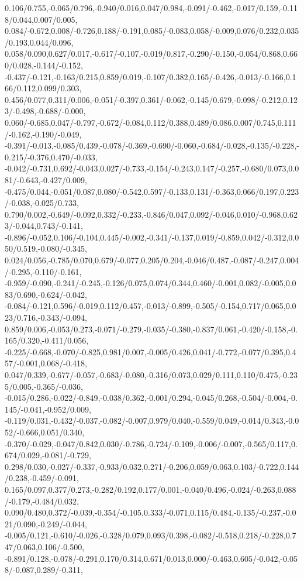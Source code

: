 {0.106/0.755,-0.065/0.796,-0.940/0.016,0.047/0.984,-0.091/-0.462,-0.017/0.159,-0.118/0.044,0.007/0.005,%
0.084/-0.672,0.008/-0.726,0.188/-0.191,0.085/-0.083,0.058/-0.009,0.076/0.232,0.035/0.193,0.044/0.096,%
0.058/0.090,0.627/0.017,-0.617/-0.107,-0.019/0.817,-0.290/-0.150,-0.054/0.868,0.660/0.028,-0.144/-0.152,%
-0.437/-0.121,-0.163/0.215,0.859/0.019,-0.107/0.382,0.165/-0.426,-0.013/-0.166,0.166/0.112,0.099/0.303,%
0.456/0.077,0.311/0.006,-0.051/-0.397,0.361/-0.062,-0.145/0.679,-0.098/-0.212,0.123/-0.498,-0.688/-0.000,%
0.060/-0.685,0.047/-0.797,-0.672/-0.084,0.112/0.388,0.489/0.086,0.007/0.745,0.111/-0.162,-0.190/-0.049,%
-0.391/-0.013,-0.085/0.439,-0.078/-0.369,-0.690/-0.060,-0.684/-0.028,-0.135/-0.228,-0.215/-0.376,0.470/-0.033,%
-0.042/-0.731,0.692/-0.043,0.027/-0.733,-0.154/-0.243,0.147/-0.257,-0.680/0.073,0.081/-0.643,-0.427/0.009,%
-0.475/0.044,-0.051/0.087,0.080/-0.542,0.597/-0.133,0.131/-0.363,0.066/0.197,0.223/-0.038,-0.025/0.733,%
0.790/0.002,-0.649/-0.092,0.332/-0.233,-0.846/0.047,0.092/-0.046,0.010/-0.968,0.623/-0.044,0.743/-0.141,%
-0.896/-0.052,0.106/-0.104,0.445/-0.002,-0.341/-0.137,0.019/-0.859,0.042/-0.312,0.050/0.519,-0.080/-0.345,%
0.024/0.056,-0.785/0.070,0.679/-0.077,0.205/0.204,-0.046/0.487,-0.087/-0.247,0.004/-0.295,-0.110/-0.161,%
-0.959/-0.090,-0.241/-0.245,-0.126/0.075,0.074/0.344,0.460/-0.001,0.082/-0.005,0.083/0.690,-0.624/-0.042,%
-0.084/-0.121,0.596/-0.019,0.112/0.457,-0.013/-0.899,-0.505/-0.154,0.717/0.065,0.023/0.716,-0.343/-0.094,%
0.859/0.006,-0.053/0.273,-0.071/-0.279,-0.035/-0.380,-0.837/0.061,-0.420/-0.158,-0.165/0.320,-0.411/0.056,%
-0.225/-0.668,-0.070/-0.825,0.981/0.007,-0.005/0.426,0.041/-0.772,-0.077/0.395,0.457/-0.001,0.068/-0.418,%
0.047/0.339,-0.677/-0.057,-0.683/-0.080,-0.316/0.073,0.029/0.111,0.110/0.475,-0.235/0.005,-0.365/-0.036,%
-0.015/0.286,-0.022/-0.849,-0.038/0.362,-0.001/0.294,-0.045/0.268,-0.504/-0.004,-0.145/-0.041,-0.952/0.009,%
-0.119/0.031,-0.432/-0.037,-0.082/-0.007,0.979/0.040,-0.559/0.049,-0.014/0.343,-0.052/-0.666,0.051/0.340,%
-0.370/-0.029,-0.047/0.842,0.030/-0.786,-0.724/-0.109,-0.006/-0.007,-0.565/0.117,0.674/0.029,-0.081/-0.729,%
0.298/0.030,-0.027/-0.337,-0.933/0.032,0.271/-0.206,0.059/0.063,0.103/-0.722,0.144/0.238,-0.459/-0.091,%
0.165/0.097,0.377/0.273,-0.282/0.192,0.177/0.001,-0.040/0.496,-0.024/-0.263,0.088/-0.179,-0.484/0.032,%
0.090/0.480,0.372/-0.039,-0.354/-0.105,0.333/-0.071,0.115/0.484,-0.135/-0.237,-0.021/0.090,-0.249/-0.044,%
-0.005/0.121,-0.610/-0.026,-0.328/0.079,0.093/0.398,-0.082/-0.518,0.218/-0.228,0.747/0.063,0.106/-0.500,%
-0.891/0.128,-0.078/-0.291,0.170/0.314,0.671/0.013,0.000/-0.463,0.605/-0.042,-0.058/-0.087,0.289/-0.311,%
}
